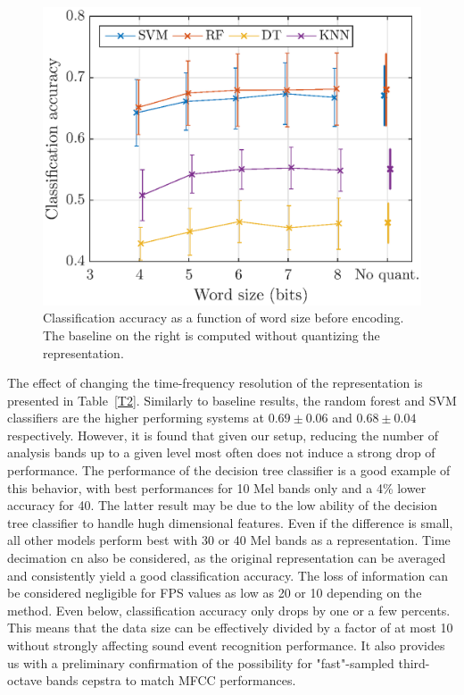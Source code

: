\documentclass[12pt,times,onecolumn]{article}
\begin{document}
\begin{figure}[htbp]
	\centering
		\includegraphics[width=0.7\columnwidth]{figures/class_mel_q.eps}
	\caption{Classification accuracy as a function of word size before encoding. The baseline on the right is computed without quantizing the representation.}
	\label{fig:class_mel_q}
\end{figure}

The effect of changing the time-frequency resolution of the representation is presented in Table~\ref{T2}. Similarly to baseline results, the random forest and SVM classifiers are the higher performing systems at $0.69\pm 0.06$ and $0.68\pm 0.04$ respectively. However, it is found that given our setup, reducing the number of analysis bands up to a given level most often does not induce a strong drop of performance. The performance of the decision tree classifier is a good example of this behavior, with best performances for 10 Mel bands only and a 4\% lower accuracy for 40. The latter result may be due to the low ability of the decision tree classifier to handle hugh dimensional features. Even if the difference is small, all other models perform best with 30 or 40 Mel bands as a representation. Time decimation cn also be considered, as the original representation can be averaged and consistently yield a good classification accuracy. The loss of information can be considered negligible for FPS values as low as 20 or 10 depending on the method. Even below, classification accuracy only drops by one or a few percents. This means that the data size can be effectively divided by a factor of at most 10 without strongly affecting sound event recognition performance. It also provides us with a preliminary confirmation of the possibility for "fast"-sampled third-octave bands cepstra to match MFCC performances.\\
\end{document}

